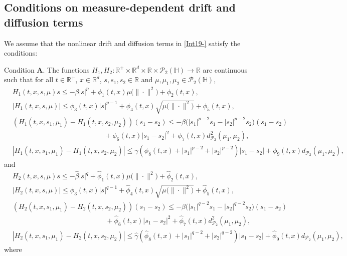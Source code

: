 \documentclass[11pt]{article}
\renewcommand{\leq}{\leqslant}
\numberwithin{equation}{section}
\begin{document}
\subsection{Conditions on measure-dependent drift and diffusion terms}
We assume that the  nonlinear
drift and diffusion terms
in \eqref{Int19-} satisfy the
conditions:


Condition \textbf{A}. The
functions
$H_1,H_2:\mathbb{R}^+\times\mathbb{R}^d
\times\mathbb{R}\times
\mathcal{P}_2(\mathbb{H})
\rightarrow\mathbb{R}$ are
continuous such that
for all $t\in\mathbb{R}^+$, $x\in\mathbb{R}^d$,
$s,s_1,s_2\in\mathbb{R}$ and $\mu,\mu_1,\mu_2\in\mathcal{P}_2(\mathbb{H})$,
\begin{subequations} \begin{align}\label{f1}&
H_1(t,x,s,\mu)s\leq-\beta|s|^p+
\phi_1(t,x)
\mu\big(\|\cdot\|^2
\big)+
\phi_2(t,x),
\\\label{f2}&|H_1(t,x,s,\mu)
|\leq\phi_3(t,x)|s|^{p-1}+
\phi_4(t,x)
\sqrt{\mu\big(\|\cdot\|^2\big)}
+\phi_5(t,x),
\\\label{f3}&(H_1(t,x,s_1,\mu_1)
-H_1(t,x,s_2,\mu_2))(s_1-s_2)
\leq-\beta
\big(|s_1|^{p-2}s_1-|s_2|^{p-2}s_2\big)(s_1-s_2)
\nonumber\\&\ \ \ \ \ \ \ \ \ \ \ \ \ \ \ \ \ \ \ \ \ \ \ \ \ \ \ \ \ \ \ \ \ \ \ \ \ \ \ \ \   \ \ \ \ \ \ \ \ \ \ \ \ \ \ \ \ \ \ +
\phi_6(t,x)|s_1-s_2|^2+
\phi_7(t,x)
d_{\mathcal{P}_2}^2
(\mu_1,\mu_2),
\\\label{f4}&|H_1(t,x,s_1,\mu_1)
-H_1(t,x,s_2,\mu_2)|
\leq\gamma (\phi_8(t,x) +   |s_1|^{p-2}+|s_2|^{p-2})|s_1-s_2|+
\phi_9(t,x)
d_{\mathcal{P}_2}
(\mu_1,\mu_2),
\end{align}
\end{subequations}
and
\begin{subequations}\begin{align}\label{ff1}&
H_2(t,x,s,\mu)s\leq-\widehat{\beta}|s|^q+
\widehat{\phi}_1(t,x)
\mu\big(\|\cdot\|^2
\big)+
\widehat{\phi}_2(t,x),
\\\label{ff2}&|H_2(t,x,s,\mu)
|\leq\widehat{\phi}_3(t,x)|s|^{q-1}+
\widehat{\phi}_4(t,x)
\sqrt{\mu\big(\|\cdot\|^2\big)}
+\widehat{\phi}_5(t,x),
\\\label{ff3}&(H_2(t,x,s_1,\mu_1)
-H_2(t,x,s_2,\mu_2))(s_1-s_2)
\leq-\widehat{\beta}
\big(|s_1|^{q-2}s_1-|s_2|^{q-2}
s_2\big)(s_1-s_2)\nonumber\\&\ \ \ \ \ \ \ \ \ \ \ \ \ \ \ \ \ \ \ \ \ \ \ \ \ \ \ \ \ \ \ \ \ \ \ \ \ \ \ \ \ \   \ \ \ \ \ \ \ \ \ \ \ \ \ \ \ \ \ \ +
\widehat{\phi}_6(t,x)|s_1-s_2|^2+
\widehat{\phi}_7(t,x)
d_{\mathcal{P}_2}^2
(\mu_1,\mu_2),
\\\label{ff4}&|H_2(t,x,s_1,\mu_1)
-H_2(t,x,s_2,\mu_2)|
\leq \widehat{\gamma}(\widehat{\phi}_8(t,x) +   |s_1|^{q-2}+|s_2|^{q-2})|s_1-s_2|+
\widehat{\phi}_9(t,x)
d_{\mathcal{P}_2}
(\mu_1,\mu_2),
\end{align}\end{subequations}where
\end{document}
